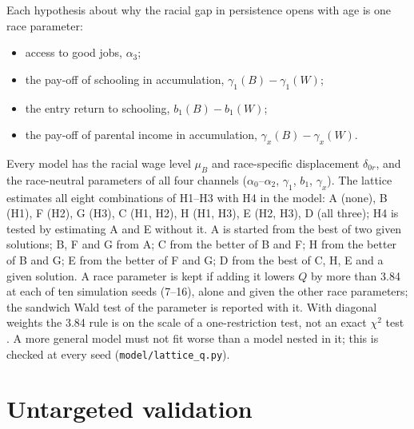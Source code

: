 \documentclass[11pt]{article}
\newcommand{\code}[1]{\texttt{#1}}
\newcommand{\1}{\mathbf{1}}
\begin{document}
Each hypothesis about why the racial gap in persistence opens with age is one race parameter:
\begin{itemize}
  \item[H1] access to good jobs, $\alpha_3$;
  \item[H2] the pay-off of schooling in accumulation, $\gamma_1(B) - \gamma_1(W)$;
  \item[H3] the entry return to schooling, $b_1(B) - b_1(W)$;
  \item[H4] the pay-off of parental income in accumulation, $\gamma_x(B) - \gamma_x(W)$.
\end{itemize}
Every model has the racial wage level $\mu_B$ and race-specific displacement $\delta_{0r}$, and the race-neutral
parameters of all four channels ($\alpha_0$--$\alpha_2$, $\gamma_1$, $b_1$, $\gamma_x$). The lattice estimates all eight
combinations of H1--H3 with H4 in the model: A (none), B (H1), F (H2), G (H3), C (H1, H2), H (H1, H3), E (H2, H3),
D (all three); H4 is tested by estimating A and E without it. A is started from the best of two given solutions; B, F
and G from A; C from the better of B and F; H from the better of B and G; E from the better of F and G; D from the best
of C, H, E and a given solution. A race parameter is kept if adding it lowers $Q$ by more than 3.84 at each of ten
simulation seeds (7--16), alone and given the other race parameters; the sandwich Wald test of the parameter is
reported with it. With diagonal weights the 3.84 rule is on the scale of a one-restriction test, not an exact
$\chi^2$ test \citep{newey1987hypothesis}. A more general model must not fit worse than a model nested in it; this is
checked at every seed (\code{model/lattice\_q.py}).

\section{Untargeted validation}\label{sec:validation}
\end{document}
